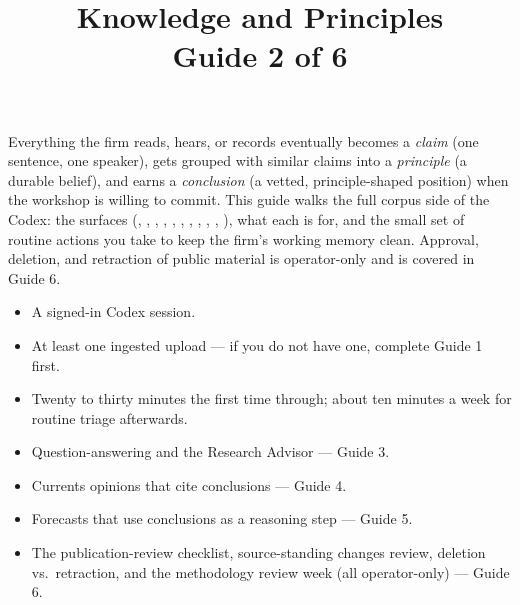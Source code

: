 \documentclass[11pt]{article}
\title{\sffamily\bfseries Knowledge and Principles\\[2pt]\large Guide 2 of 6}
\date{}
\author{}
\begin{document}
\maketitle
\thispagestyle{empty}

\begin{tldr}
Everything the firm reads, hears, or records eventually becomes a
\emph{claim} (one sentence, one speaker), gets grouped with similar
claims into a \emph{principle} (a durable belief), and earns a
\emph{conclusion} (a vetted, principle-shaped position) when the
workshop is willing to commit. This guide walks the full corpus side
of the Codex: the surfaces (, ,
, , ,
, , ,
, , ), what each
is for, and the small set of routine actions you take to keep the
firm's working memory clean. Approval, deletion, and retraction of
public material is operator-only and is covered in Guide 6.
\end{tldr}

\begin{youwillneed}
\begin{itemize}[leftmargin=*,itemsep=0.2em,topsep=0.2em]
  \item A signed-in Codex session.
  \item At least one ingested upload --- if you do not have one,
        complete Guide 1 first.
  \item Twenty to thirty minutes the first time through; about ten
        minutes a week for routine triage afterwards.
\end{itemize}
\end{youwillneed}

\begin{notcovered}
\begin{itemize}[leftmargin=*,itemsep=0.2em,topsep=0.2em]
  \item Question-answering and the Research Advisor --- Guide 3.
  \item Currents opinions that cite conclusions --- Guide 4.
  \item Forecasts that use conclusions as a reasoning step ---
        Guide 5.
  \item The publication-review checklist, source-standing changes
        review, deletion vs.\ retraction, and the methodology review
        week (all operator-only) --- Guide 6.
\end{itemize}
\end{notcovered}
\end{document}

